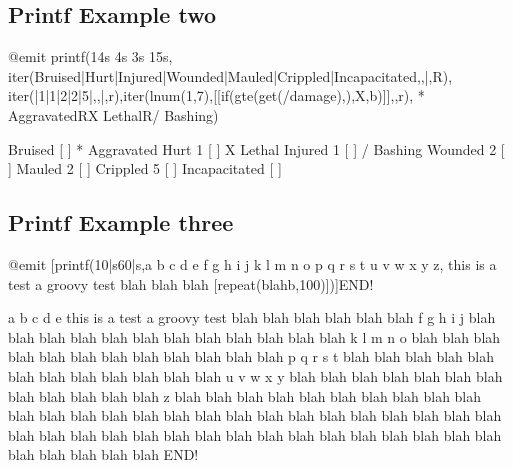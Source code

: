 \documentclass[letterpaper,10pt,english]{sphinxmanual}
\begin{document}
\subsection{Printf Example two}
\label{\detokenize{advanced:printf-example-two}}
\begin{sphinxVerbatim}[commandchars=\\\{\}]
@emit printf(\PYGZdl{}14\PYGZam{}s \PYGZdl{}\PYGZca{}4\PYGZam{}s \PYGZdl{}\PYGZhy{}3\PYGZam{}s \PYGZdl{}15\PYGZam{}s,
iter(Bruised|Hurt|Injured|Wounded|Mauled|Crippled|Incapacitated,\PYGZsh{}\PYGZsh{},|,\PYGZpc{}R),
iter(|\PYGZhy{}1|\PYGZhy{}1|\PYGZhy{}2|\PYGZhy{}2|\PYGZhy{}5|,\PYGZsh{}\PYGZsh{},|,\PYGZpc{}r),iter(lnum(1,7),\PYGZpc{}[[if(gte(get(\PYGZpc{}\PYGZsh{}/damage),\PYGZsh{}\PYGZsh{}),X,\PYGZpc{}b)]\PYGZpc{}],,\PYGZpc{}r),
* Aggravated\PYGZpc{}RX Lethal\PYGZpc{}R/ Bashing)

         Bruised      [ ]    * Aggravated
            Hurt  \PYGZhy{}1  [ ]        X Lethal
         Injured  \PYGZhy{}1  [ ]       / Bashing
         Wounded  \PYGZhy{}2  [ ]
          Mauled  \PYGZhy{}2  [ ]
        Crippled  \PYGZhy{}5  [ ]
   Incapacitated      [ ]
\end{sphinxVerbatim}


\subsection{Printf Example three}
\label{\detokenize{advanced:printf-example-three}}
\begin{sphinxVerbatim}[commandchars=\\\{\}]
@emit [printf(\PYGZdl{}\PYGZhy{}10|\PYGZdq{}\PYGZsq{}s\PYGZdl{}\PYGZhy{}60|\PYGZdq{}s,a b c d e f g h i j k l m n o p q r s t u v w x y z,
this is a test a groovy test blah blah blah [repeat(blah\PYGZpc{}b,100)])]END!

a b c d e this is a test a groovy test blah blah blah blah blah blah
f g h i j blah blah blah blah blah blah blah blah blah blah blah blah
k l m n o blah blah blah blah blah blah blah blah blah blah blah blah
p q r s t blah blah blah blah blah blah blah blah blah blah blah blah
u v w x y blah blah blah blah blah blah blah blah blah blah blah blah
z         blah blah blah blah blah blah blah blah blah blah blah blah
blah blah blah blah blah blah blah blah blah blah blah blah blah blah
blah blah blah blah blah blah blah blah blah blah blah blah blah blah
blah blah blah blah blah blah blah                                    END!
\end{sphinxVerbatim}
\end{document}
